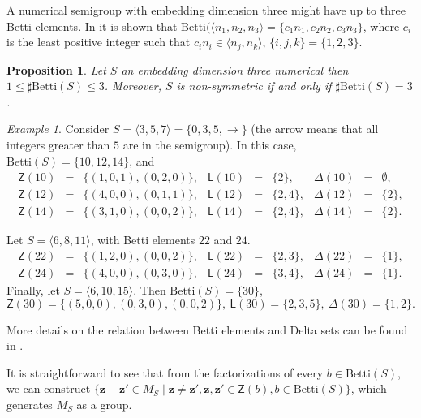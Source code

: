 \documentclass[11pt]{amsart}
\newtheorem{proposition}[theorem]{Proposition}
\theoremstyle{remark}
\newtheorem{example}[theorem]{Example}
\begin{document}
A numerical semigroup with embedding dimension three might have up to three Betti elements. In \cite[Example 8.23]{RG} it is shown that $\mathrm{Betti}(\langle n_1,n_2,n_3\rangle=\{ c_1n_1,c_2n_2,c_3n_3\}$, where $c_i$ is the least positive integer such that $c_in_i\in \langle n_j,n_k\rangle$, $\{i,j,k\}=\{1,2,3\}$. 

\begin{proposition}\cite[Chapter 9]{RG}\label{struct}
	Let $S$ an embedding dimension three numerical then $1\le \sharp \mathrm{Betti}(S)\le 3$. Moreover, $S$ is non-symmetric if and only if  $\sharp \mathrm{Betti}(S)=3$. 
\end{proposition}


\begin{example}
Consider $S=\langle 3,5,7\rangle=\{0,3,5,\to\}$ (the arrow means that all integers greater than $5$ are in the semigroup). 
In this case,  $\mathrm{Betti}(S)=\{10,12,14\}$, and 
		\[
		\begin{array}{rclrclrcl}
		\mathsf Z(10) & = & \{(1,0,1),(0,2,0)\}, & \mathsf{L}(10) & = & \{2\},  & \Delta(10) & = & \emptyset, \\
		\mathsf Z(12) & = & \{(4,0,0),(0,1,1)\}, & \mathsf{L}(12) & = & \{2,4\},  & \Delta(12) & = & \{2\},\\
		\mathsf Z(14) & = & \{(3,1,0),(0,0,2)\}, & \mathsf{L}(14) & = & \{2,4\}, & \Delta(14) & = & \{2\}.
		\end{array}
		\]

Let $S=\langle 6,8,11\rangle$, with Betti elements $22$ and $24$.
	\[
	\begin{array}{rclrclrcl}
	\mathsf Z(22) & = & \{(1,2,0),(0,0,2)\}, & \mathsf{L}(22) & = & \{2,3\}, & \Delta(22) & = & \{1\},\\
	\mathsf Z(24) & = & \{(4,0,0),(0,3,0)\}, & \mathsf{L}(24) & = & \{3,4\}, & \Delta(24) & = & \{1\}.
	\end{array}
	\]
Finally, let $S=\langle 6,10,15\rangle$. Then $\mathrm{Betti}(S)=\{30\}$, 
\[
\mathsf Z(30)=\{(5,0,0),(0,3,0),(0,0,2)\},\  \mathsf L(30)=\{2,3,5\},\  \mathsf \Delta(30)=\{1,2\}.
\]
\end{example} 
More details on the relation between Betti elements and Delta sets can be found in \cite{CGLMS}.


It is straightforward to see that from the factorizations of every $b\in \mathrm{Betti}(S)$, we can construct $\{\mathbf z-\mathbf z'\in M_S\mid \mathbf z\neq \mathbf z', \mathbf z,\mathbf z'\in \mathsf Z(b), b\in \mathrm{Betti}(S)\}$, which generates $M_S$ as a group. 
\end{document}
